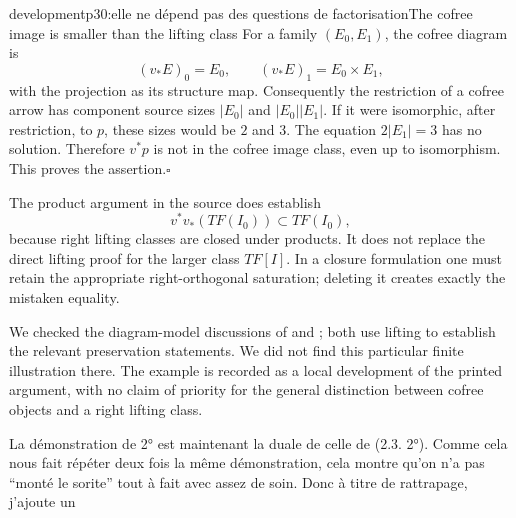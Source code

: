 \begin{dcomment}{development}{p30:elle ne dépend pas des questions de factorisation}{The cofree image is smaller than the lifting class}
For a family $(E_0,E_1)$, the cofree diagram is
\[
 (v_*E)_0=E_0,\qquad (v_*E)_1=E_0\times E_1,
\]
with the projection as its structure map. Consequently the restriction of a cofree arrow has component source sizes $|E_0|$ and $|E_0||E_1|$. If it were isomorphic, after restriction, to $p$, these sizes would be $2$ and $3$. The equation $2|E_1|=3$ has no solution. Therefore $v^*p$ is not in the cofree image class, even up to isomorphism. This proves the assertion.\hfill$\square$

The product argument in the source does establish
\[
 v^*v_*(TF(I_0))\subset TF(I_0),
\]
because right lifting classes are closed under products. It does not replace the direct lifting proof for the larger class $TF[I]$. In a closure formulation one must retain the appropriate right-orthogonal saturation; deleting it creates exactly the mistaken equality.

We checked the diagram-model discussions of \citet[§A.2.8]{Lurie2009HTT} and \citet[Corollary~1.4.22]{Cisinski2006}; both use lifting to establish the relevant preservation statements. We did not find this particular finite illustration there. The example is recorded as a local development of the printed argument, with no claim of priority for the general distinction between cofree objects and a right lifting class.
\end{dcomment}


La démonstration de 2° est maintenant la duale de celle de (2.3. 2°). Comme cela nous fait répéter deux fois la même démonstration, cela montre qu'on n'a pas “monté le sorite” tout à fait avec assez de soin. Donc à titre de rattrapage, j'ajoute un


